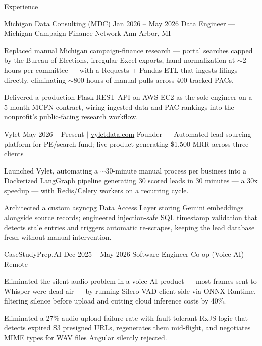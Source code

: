 \documentclass[
	11pt
]{../../../template}
\begin{document}
	\begin{rSection}{E}{xperience}
		\begin{rSectionEntry}
			{Michigan Data Consulting (MDC)}
			{Jan 2026 -- May 2026}
			{Data Engineer --- Michigan Campaign Finance Network}
			{}
			{Ann Arbor, MI}

			\item Replaced manual Michigan campaign-finance research --- portal searches capped by the Bureau of Elections, irregular Excel exports, hand normalization at $\sim$2 hours per committee --- with a Requests + Pandas ETL that ingests filings directly, eliminating $\sim$800 hours of manual pulls across 400 tracked PACs.
			\item Delivered a production Flask REST API on AWS EC2 as the sole engineer on a 5-month MCFN contract, wiring ingested data and PAC rankings into the nonprofit's public-facing research workflow.
		\end{rSectionEntry}

		\begin{rSectionEntry}
			{Vylet}
			{May 2026 -- Present $\vert$ \href{https://vyletdata.com}{vyletdata.com}}
			{Founder --- Automated lead-sourcing platform for PE/search-fund; live product generating \$1,500 MRR across three clients}
			{}
			{}

			\item Launched Vylet, automating a $\sim$30-minute manual process per business into a Dockerized LangGraph pipeline generating 30 scored leads in 30 minutes --- a 30x speedup --- with Redis/Celery workers on a recurring cycle.
			\item Architected a custom asyncpg Data Access Layer storing Gemini embeddings alongside source records; engineered injection-safe SQL timestamp validation that detects stale entries and triggers automatic re-scrapes, keeping the lead database fresh without manual intervention.
		\end{rSectionEntry}

		\begin{rSectionEntry}
			{CaseStudyPrep.AI}
			{Dec 2025 -- May 2026}
			{Software Engineer Co-op (Voice AI)}
			{}
			{Remote}

			\item Eliminated the silent-audio problem in a voice-AI product --- most frames sent to Whisper were dead air --- by running Silero VAD client-side via ONNX Runtime, filtering silence before upload and cutting cloud inference costs by 40\%.
			\item Eliminated a 27\% audio upload failure rate with fault-tolerant RxJS logic that detects expired S3 presigned URLs, regenerates them mid-flight, and negotiates MIME types for WAV files Angular silently rejected.
		\end{rSectionEntry}
	\end{rSection}
\end{document}
